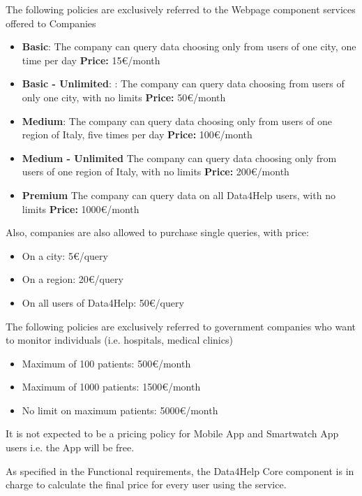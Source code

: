 The following policies are exclusively referred to the Webpage component services offered to Companies

\begin{itemize}
    \item \textbf{Basic}: The company can query data choosing only from users of one city, one time per day
     \textbf{Price:} 15\euro/month
    \item	\textbf{Basic - Unlimited}: : The company can query data choosing from users of only one city, with no limits
\textbf{Price:} 50\euro/month
    \item \textbf{Medium}: The company can query data choosing only from users of one region of Italy, five times per day
\textbf{Price:} 100\euro/month
    \item \textbf{Medium - Unlimited} The company can query data choosing only from users of one region of Italy, with no limits
\textbf{Price:} 200\euro/month
    \item \textbf{Premium} The company can query data on all Data4Help users, with no limits
\textbf{Price:} 1000\euro/month
\end{itemize}

\noindent Also, companies are also allowed to purchase single queries, with price:

\begin{itemize}
    \item On a city: 5\euro/query
    \item On a region: 20\euro/query
    \item On all users of Data4Help: 50\euro/query
\end{itemize}

\noindent The following policies are exclusively referred to government companies who want to monitor individuals (i.e. hospitals, medical clinics) 

\begin{itemize}
    \item Maximum of 100 patients:
500\euro/month
    \item Maximum of 1000 patients: 
1500\euro/month
    \item No limit on maximum patients:
5000\euro/month
\end{itemize}




\noindent It is not expected to be a pricing policy for Mobile App and Smartwatch App users i.e. the App will be free.

\noindent As specified in the Functional requirements, the Data4Help Core component is in charge to calculate the final price for every user using the service.







